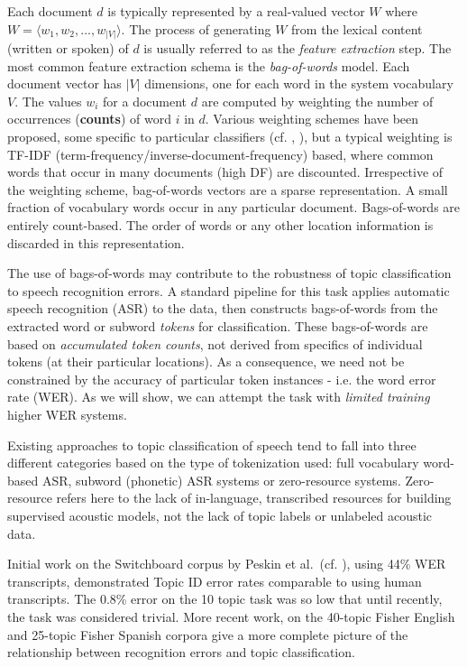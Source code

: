 Each document $d$ is typically represented by a real-valued vector $W$ where $W=\langle w_1, w_2,..., w_{|V|}\rangle$.  The process of generating $W$ from the lexical content (written or spoken) of $d$ is usually referred to as the \textit{feature extraction} step.  The most common feature extraction schema is the \textit{bag-of-words} model.  Each document vector has $|V|$ dimensions, one for each word in the system vocabulary $V$.  The values $w_i$ for a document $d$ are computed by weighting the number of occurrences (\textbf{counts}) of word $i$ in $d$.  Various weighting schemes have been proposed, some specific to particular classifiers (cf. \cite{mccallum1998}, \cite{rennie2003}), but a typical weighting is TF-IDF (term-frequency/inverse-document-frequency) based, where common words that occur in many documents (high DF) are discounted.  Irrespective of the weighting scheme, bag-of-words vectors are a sparse representation.  A small fraction of vocabulary words occur in any particular document.  Bags-of-words are entirely count-based.  The order of words or any other location information is discarded in this representation.

The use of bags-of-words may contribute to the robustness of topic classification to speech recognition errors.  A standard pipeline for this task applies automatic speech recognition (ASR) to the data, then constructs bags-of-words from the extracted word or subword \textit{tokens} for classification.  These bags-of-words are based on \textit{accumulated token counts}, not derived from specifics of individual tokens (at their particular locations).  As a consequence, we need not be constrained by the accuracy of particular token instances - i.e. the word error rate (WER).  As we will show, we can attempt the task with \textit{limited training} higher WER systems.

Existing approaches to topic classification of speech tend to fall into three different categories based on the type of tokenization used: full vocabulary word-based ASR, subword (phonetic) ASR systems or zero-resource systems.  Zero-resource refers here to the lack of in-language, transcribed resources for building supervised acoustic models, not the lack of topic labels or unlabeled acoustic data.  

Initial work on the Switchboard corpus \cite{godfrey1992} by Peskin et al.\ (cf.  \cite{peskin1996improvements}), using 44\% WER transcripts, demonstrated Topic ID error rates comparable to using human transcripts.  The 0.8\% error on the 10 topic task was so low that until recently, the task was considered trivial.  More recent work, on the 40-topic Fisher English and 25-topic Fisher Spanish corpora give a more complete picture of the relationship between recognition errors and topic classification.


